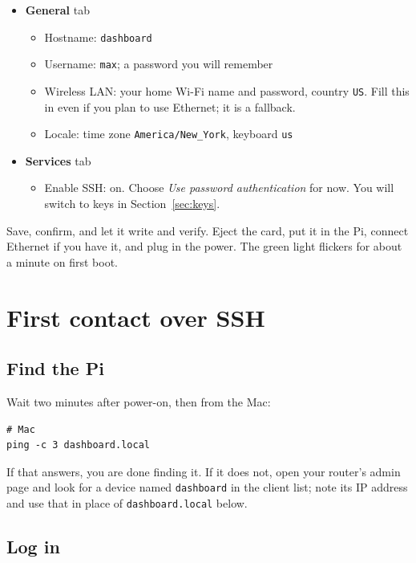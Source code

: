 \documentclass[11pt,letterpaper]{article}
\newcommand{\cmd}[1]{\texttt{#1}}
\begin{document}
\begin{itemize}[nosep]
  \item \textbf{General} tab
  \begin{itemize}[nosep]
    \item Hostname: \cmd{dashboard}
    \item Username: \cmd{max}; a password you will remember
    \item Wireless LAN: your home Wi-Fi name and password, country \cmd{US}. Fill this in even if you plan to use Ethernet; it is a fallback.
    \item Locale: time zone \cmd{America/New\_York}, keyboard \cmd{us}
  \end{itemize}
  \item \textbf{Services} tab
  \begin{itemize}[nosep]
    \item Enable SSH: on. Choose \emph{Use password authentication} for now. You will switch to keys in Section~\ref{sec:keys}.
  \end{itemize}
\end{itemize}

Save, confirm, and let it write and verify. Eject the card, put it in the Pi, connect Ethernet if you have it, and plug in the power. The green light flickers for about a minute on first boot.

\section{First contact over SSH}

\subsection{Find the Pi}

Wait two minutes after power-on, then from the Mac:

\begin{lstlisting}
# Mac
ping -c 3 dashboard.local
\end{lstlisting}

If that answers, you are done finding it. If it does not, open your router's admin page and look for a device named \cmd{dashboard} in the client list; note its IP address and use that in place of \cmd{dashboard.local} below.

\subsection{Log in}
\end{document}
